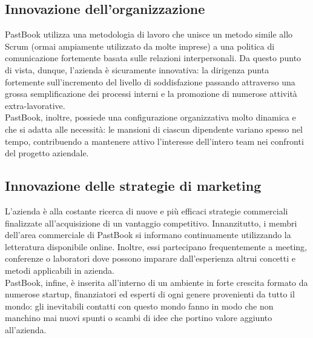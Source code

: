 		\subsection{Innovazione dell'organizzazione}
			PastBook utilizza una metodologia di lavoro che unisce un metodo simile allo Scrum (ormai ampiamente utilizzato da molte
			imprese) a una politica di comunicazione fortemente basata sulle relazioni interpersonali. Da questo punto di vista, dunque,
			l'azienda è sicuramente innovativa: la dirigenza punta fortemente sull'incremento del livello di soddisfazione passando
			attraverso una grossa semplificazione dei processi interni e la promozione di numerose attività extra-lavorative.\\
			PastBook, inoltre, possiede una configurazione organizzativa molto dinamica e che si adatta alle necessità: le mansioni di
			ciascun dipendente variano spesso nel tempo, contribuendo a mantenere attivo l'interesse dell'intero team nei confronti del
			progetto aziendale.
		\subsection{Innovazione delle strategie di marketing}
			L'azienda è alla costante ricerca di nuove e più efficaci strategie commerciali finalizzate all'acquisizione di un vantaggio
			competitivo. Innanzitutto, i membri dell'area commerciale di PastBook si informano continuamente utilizzando la letteratura
			disponibile online. Inoltre, essi partecipano frequentemente a meeting, conferenze o laboratori dove possono imparare
			dall'esperienza altrui concetti e metodi applicabili in azienda.\\
			PastBook, infine, è inserita all'interno di un ambiente in forte crescita formato da numerose startup, finanziatori ed
			esperti di ogni genere provenienti da tutto il mondo: gli inevitabili contatti con questo mondo fanno in modo che non
			manchino mai nuovi spunti o scambi di idee che portino valore aggiunto all'azienda.
